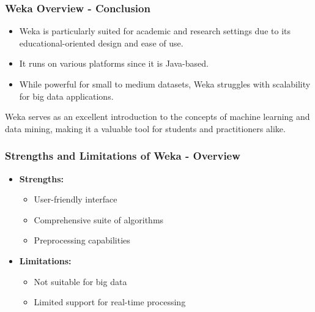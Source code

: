 \documentclass[aspectratio=169]{beamer}
\begin{document}
\begin{frame}[fragile]
    \frametitle{Weka Overview - Conclusion}
    \begin{itemize}
        \item Weka is particularly suited for academic and research settings due 
            to its educational-oriented design and ease of use.
        
        \item It runs on various platforms since it is Java-based.
        
        \item While powerful for small to medium datasets, Weka struggles with scalability 
            for big data applications.
    \end{itemize}
    Weka serves as an excellent introduction to the concepts of machine learning 
    and data mining, making it a valuable tool for students and practitioners alike.
\end{frame}

\begin{frame}[fragile]
    \frametitle{Strengths and Limitations of Weka - Overview}
    \begin{itemize}
        \item \textbf{Strengths:}
        \begin{itemize}
            \item User-friendly interface
            \item Comprehensive suite of algorithms
            \item Preprocessing capabilities
        \end{itemize}
        \item \textbf{Limitations:}
        \begin{itemize}
            \item Not suitable for big data
            \item Limited support for real-time processing
        \end{itemize}
    \end{itemize}
\end{frame}
\end{document}
